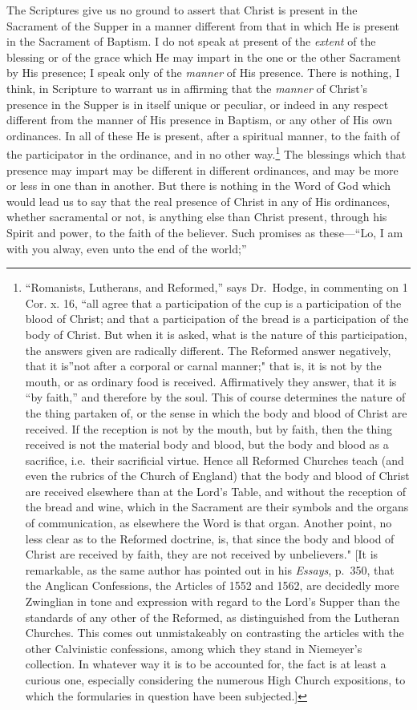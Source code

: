 \documentclass[english,]{book}
\begin{document}
The Scriptures give us no ground to assert that Christ is present in the Sacrament of the Supper in a manner different from that in which He is present in the Sacrament of Baptism. I do not speak at present of the \emph{extent} of the blessing or of the grace which He may impart in the one or the other Sacrament by His presence; I speak only of the \emph{manner} of His presence. There is nothing, I think, in Scripture to warrant us in affirming that the \emph{manner} of Christ's presence in the Supper is in itself unique or peculiar, or indeed in any respect different from the manner of His presence in Baptism, or any other of His own ordinances. In all of these He is present, after a spiritual manner, to the faith of the participator in the ordinance, and in no other way.\footnote{``Romanists, Lutherans, and Reformed,'' says Dr.~Hodge, in commenting on 1 Cor. x. 16, ``all agree that a participation of the cup is a participation of the blood of Christ; and that a participation of the bread is a participation of the body of Christ. But when it is asked, what is the nature of this participation, the answers given are radically different. The Reformed answer negatively, that it is''not after a corporal or carnal manner;" that is, it is not by the mouth, or as ordinary food is received. Affirmatively they answer, that it is ``by faith,'' and therefore by the soul. This of course determines the nature of the thing partaken of, or the sense in which the body and blood of Christ are received. If the reception is not by the mouth, but by faith, then the thing received is not the material body and blood, but the body and blood as a sacrifice, i.e.~their sacrificial virtue. Hence all Reformed Churches teach (and even the rubrics of the Church of England) that the body and blood of Christ are received elsewhere than at the Lord's Table, and without the reception of the bread and wine, which in the Sacrament are their symbols and the organs of communication, as elsewhere the Word is that organ. Another point, no less clear as to the Reformed doctrine, is, that since the body and blood of Christ are received by faith, they are not received by unbelievers." {[}It is remarkable, as the same author has pointed out in his \emph{Essays}, p.~350, that the Anglican Confessions, the Articles of 1552 and 1562, are decidedly more Zwinglian in tone and expression with regard to the Lord's Supper than the standards of any other of the Reformed, as distinguished from the Lutheran Churches. This comes out unmistakeably on contrasting the articles with the other Calvinistic confessions, among which they stand in Niemeyer's collection. In whatever way it is to be accounted for, the fact is at least a curious one, especially considering the numerous High Church expositions, to which the formularies in question have been subjected.{]}} The blessings which that presence may impart may be different in different ordinances, and may be more or less in one than in another. But there is nothing in the Word of God which would lead us to say that the real presence of Christ in any of His ordinances, whether sacramental or not, is anything else than Christ present, through his Spirit and power, to the faith of the believer. Such promises as these---``Lo, I am with you alway, even unto the end of the world;'' 
\end{document}
